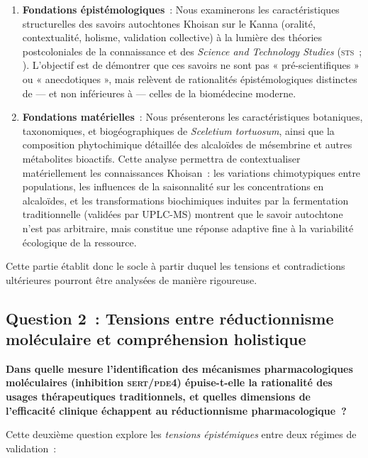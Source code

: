 \documentclass[12pt,a4paper,twoside]{book}
\newcommand{\kanna}{\textit{Sceletium tortuosum}}
\begin{document}
\begin{enumerate}
\item \textbf{Fondations épistémologiques}~: Nous examinerons les caractéristiques structurelles des savoirs autochtones Khoisan sur le Kanna (oralité, contextualité, holisme, validation collective) à la lumière des théories postcoloniales de la connaissance \parencite{harding1998,santos2014,smith1999} et des \textit{Science and Technology Studies} (\textsc{sts}~; \cite{latour1979,haraway1988}). L'objectif est de démontrer que ces savoirs ne sont pas « pré-scientifiques » ou « anecdotiques », mais relèvent de rationalités épistémologiques distinctes de --- et non inférieures à --- celles de la biomédecine moderne.

\item \textbf{Fondations matérielles}~: Nous présenterons les caractéristiques botaniques, taxonomiques, et biogéographiques de \kanna{}, ainsi que la composition phytochimique détaillée des alcaloïdes de mésembrine et autres métabolites bioactifs. Cette analyse permettra de contextualiser matériellement les connaissances Khoisan~: les variations chimotypiques entre populations, les influences de la saisonnalité sur les concentrations en alcaloïdes, et les transformations biochimiques induites par la fermentation traditionnelle (validées par UPLC-MS) montrent que le savoir autochtone n'est pas arbitraire, mais constitue une réponse adaptive fine à la variabilité écologique de la ressource.
\end{enumerate}

Cette partie établit donc le socle à partir duquel les tensions et contradictions ultérieures pourront être analysées de manière rigoureuse.

\subsection{Question 2~: Tensions entre réductionnisme moléculaire et compréhension holistique}

\textbf{Dans quelle mesure l'identification des mécanismes pharmacologiques moléculaires (inhibition \textsc{sert}/\textsc{pde4}) épuise-t-elle la rationalité des usages thérapeutiques traditionnels, et quelles dimensions de l'efficacité clinique échappent au réductionnisme pharmacologique~?}

Cette deuxième question explore les \textit{tensions épistémiques} entre deux régimes de validation~:
\end{document}

